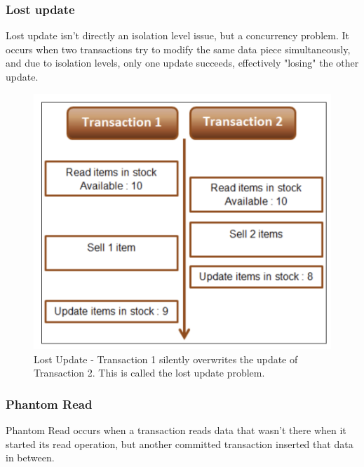 \subsubsection{Lost update}

Lost update isn't directly an isolation level issue, but a concurrency problem. It occurs when two transactions try to modify the same data piece simultaneously, and due to isolation levels, only one update succeeds, effectively "losing" the other update.


\begin{figure}[H]
  \includegraphics[width=\linewidth]{images/jdbc/lost_update.png}
  \caption{Lost Update - Transaction 1 silently overwrites the update of Transaction 2. This is called the lost update problem.}
  \label{fig:paths}
\end{figure}

\subsubsection{Phantom Read}

Phantom Read occurs when a transaction reads data that wasn't there when it started its read operation, but another committed transaction inserted that data in between. 

